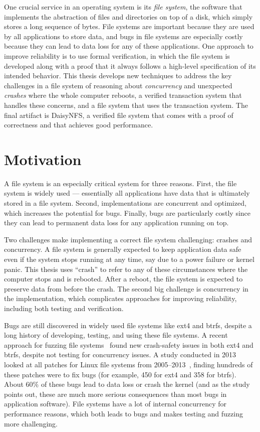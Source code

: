 One crucial service in an operating system is its \emph{file system}, the
software that implements the abstraction of files and directories on top of a
disk, which simply stores a long sequence of bytes. File systems are important
because they are used by all applications to store data, and bugs in file
systems are especially costly because they can lead to data loss for any of
these applications. One approach to improve reliability is to use formal
verification, in which the file system is developed along with a proof that it
always follows a high-level specification of its intended behavior. This thesis
develops new techniques to address the key challenges in a file system of
reasoning about \emph{concurrency} and unexpected \emph{crashes} where the whole
computer reboots, a verified transaction system that handles these concerns, and
a file system that uses the transaction system. The final artifact is DaisyNFS,
a verified file system that comes with a proof of correctness and that achieves
good performance.

\section{Motivation}
\label{sec:intro:motivation}

A file system is an especially critical system for
three reasons. First, the file system is widely used --- essentially all applications have
data that is ultimately stored in a file system. Second, implementations are
concurrent and optimized, which increases the potential for bugs. Finally, bugs
are particularly costly since they can lead to permanent data loss for any
application running on top.

Two challenges make implementing a correct file system challenging: crashes and
concurrency. A file system is generally expected to keep application data safe
even if the system stops running at any time, say due to a power failure or
kernel panic. This thesis uses ``crash'' to refer to any of these circumstances
where the computer stops and is rebooted. After a reboot, the file system is
expected to preserve data from before the crash. The second big challenge is
concurrency in the implementation, which complicates approaches for improving
reliability, including both testing and verification.

Bugs are still discovered in widely used file systems like ext4 and btrfs,
despite a long history of developing, testing, and using these file systems. A
recent approach for fuzzing file systems~\cite{kim:hydra} found new crash-safety
issues in both ext4 and btrfs, despite not testing for concurrency issues. A
study conducted in 2013 looked at all patches for Linux file systems from
2005--2013~\cite{lu:fsstudy}, finding hundreds of these patches were to fix bugs
(for example, 450 for ext4 and 358 for btrfs). About 60\% of these bugs lead to
data loss or crash the kernel (and as the study points out, these are much more
serious consequences than most bugs in application software). File systems have
a lot of internal concurrency for performance reasons, which both leads to bugs
and makes testing and fuzzing more challenging.

